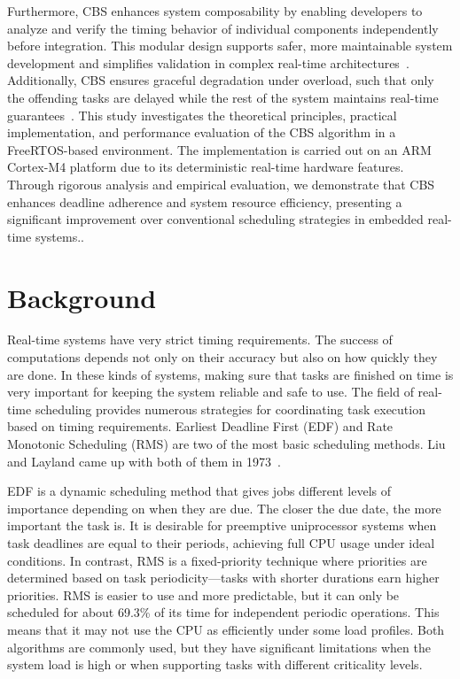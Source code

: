 \documentclass[conference]{IEEEtran}
\begin{document}
Furthermore, CBS enhances system composability by enabling developers to analyze and verify the timing behavior of individual components independently before integration. This modular design supports safer, more maintainable system development and simplifies validation in complex real-time architectures~\cite{buttazzo2011hard}. Additionally, CBS ensures graceful degradation under overload, such that only the offending tasks are delayed while the rest of the system maintains real-time guarantees~\cite{cucinotta2009providing}. This study investigates the theoretical principles, practical implementation, and performance evaluation of the CBS algorithm in a FreeRTOS-based environment. The implementation is carried out on an ARM Cortex-M4 platform due to its deterministic real-time hardware features. Through rigorous analysis and empirical evaluation, we demonstrate that CBS enhances deadline adherence and system resource efficiency, presenting a significant improvement over conventional scheduling strategies in embedded real-time systems..


\section{\textbf{Background}}

Real-time systems have very strict timing requirements. The success of computations depends not only on their accuracy but also on how quickly they are done. In these kinds of systems, making sure that tasks are finished on time is very important for keeping the system reliable and safe to use. The field of real-time scheduling provides numerous strategies for coordinating task execution based on timing requirements. Earliest Deadline First (EDF) and Rate Monotonic Scheduling (RMS) are two of the most basic scheduling methods. Liu and Layland came up with both of them in 1973~\cite{liu1973scheduling}.

EDF is a dynamic scheduling method that gives jobs different levels of importance depending on when they are due. The closer the due date, the more important the task is. It is desirable for preemptive uniprocessor systems when task deadlines are equal to their periods, achieving full CPU usage under ideal conditions. In contrast, RMS is a fixed-priority technique where priorities are determined based on task periodicity—tasks with shorter durations earn higher priorities. RMS is easier to use and more predictable, but it can only be scheduled for about 69.3\% of its time for independent periodic operations. This means that it may not use the CPU as efficiently under some load profiles. Both algorithms are commonly used, but they have significant limitations when the system load is high or when supporting tasks with different criticality levels.
\end{document}
